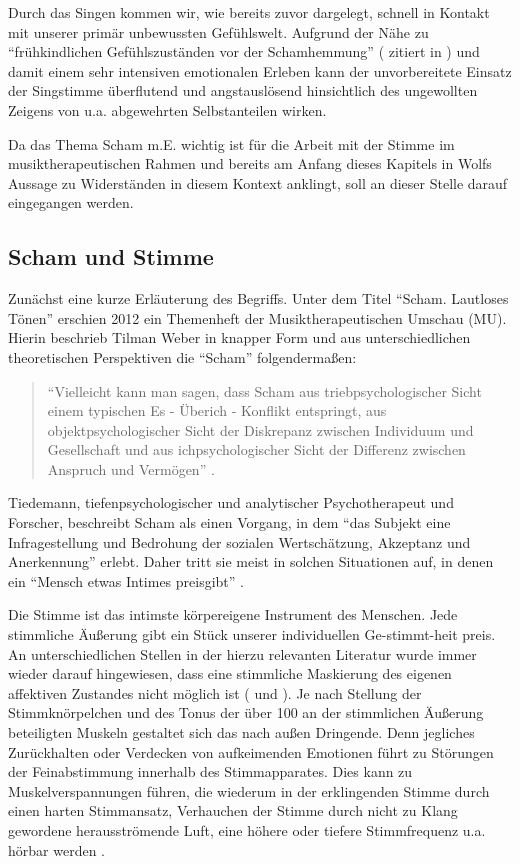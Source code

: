 Durch das Singen kommen wir, wie bereits zuvor dargelegt, schnell in Kontakt mit unserer primär unbewussten Gefühlswelt. Aufgrund der Nähe zu "`frühkindlichen Gefühlszuständen vor der Schamhemmung"' (\cite{klausmeier1978} zitiert in \cite[107]{rittner1990}) und damit einem sehr intensiven emotionalen Erleben kann der unvorbereitete Einsatz der Singstimme überflutend und angstauslösend hinsichtlich des ungewollten Zeigens von u.a. abgewehrten Selbstanteilen wirken. 

Da das Thema Scham m.E. wichtig ist für die Arbeit mit der Stimme im musiktherapeutischen Rahmen und bereits am Anfang dieses Kapitels in Wolfs Aussage zu Widerständen in diesem Kontext anklingt, soll an dieser Stelle darauf eingegangen werden.

\subsection{Scham und Stimme}
Zunächst eine kurze Erläuterung des Begriffs. Unter dem Titel "`Scham. Lautloses Tönen"' erschien 2012 ein Themenheft der Musiktherapeutischen Umschau (MU). Hierin beschrieb Tilman Weber in knapper Form und aus unterschiedlichen theoretischen Perspektiven die "`Scham"' folgendermaßen:

\begin{quote}
\onehalfspacing
"`Vielleicht kann man sagen, dass Scham aus triebpsychologischer Sicht einem typischen Es - Überich - Konflikt entspringt, aus objektpsychologischer Sicht der Diskrepanz zwischen Individuum und Gesellschaft und aus ichpsychologischer Sicht der Differenz zwischen Anspruch und Vermögen"' \autocite[215]{weber2012}. 
\end{quote}

Tiedemann, tiefenpsychologischer und analytischer Psychotherapeut und Forscher, beschreibt Scham als einen Vorgang, in dem "`das Subjekt eine Infragestellung und Bedrohung der sozialen Wertschätzung, Akzeptanz und Anerkennung"' \autocite[219]{tiedemann2012} erlebt. Daher tritt sie meist in solchen Situationen auf, in denen ein "`Mensch etwas Intimes preisgibt"' \autocite[219]{tiedemann2012}. 

Die Stimme ist das intimste körpereigene Instrument des Menschen. Jede stimmliche Äußerung gibt ein Stück unserer individuellen Ge-stimmt-heit preis. An unterschiedlichen Stellen in der hierzu relevanten Literatur wurde immer wieder darauf hingewiesen, dass eine stimmliche Maskierung des eigenen affektiven Zustandes nicht möglich ist (\cite[vgl.][279]{deckervoigt2000} und \cite[vgl.][481]{rittner2009a}). Je nach Stellung der Stimmknörpelchen und des Tonus der über 100 an der stimmlichen Äußerung beteiligten Muskeln \autocite[vgl.][40]{cramer1998} gestaltet sich das nach außen Dringende. Denn jegliches Zurückhalten oder Verdecken von aufkeimenden Emotionen führt zu Störungen der Feinabstimmung innerhalb des Stimmapparates. Dies kann zu Muskelverspannungen führen, die wiederum in der erklingenden Stimme durch einen harten Stimmansatz, Verhauchen der Stimme durch nicht zu Klang gewordene herausströmende Luft, eine höhere oder tiefere Stimmfrequenz u.a. hörbar werden \autocite[vgl.][279]{deckervoigt2000}. 

